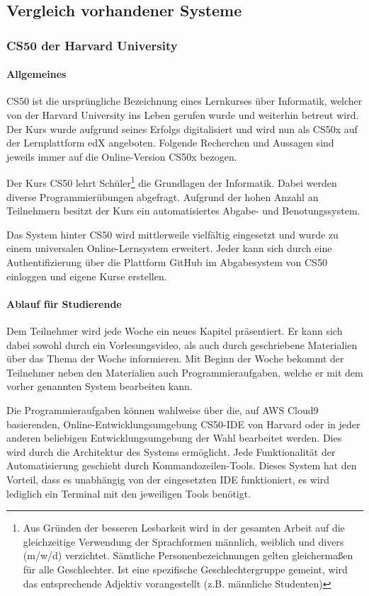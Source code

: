 \subsection{Vergleich vorhandener Systeme}
\subsubsection{CS50 der Harvard University}
\paragraph{Allgemeines}
CS50 ist die ursprüngliche Bezeichnung eines Lernkurses über Informatik,
welcher von der Harvard University ins Leben gerufen wurde und weiterhin
betreut wird. Der Kurs wurde aufgrund seines Erfolgs digitalisiert und wird nun
als CS50x auf der Lernplattform edX angeboten. Folgende Recherchen und Aussagen
sind jeweils immer auf die Online-Version CS50x bezogen.

Der Kurs CS50 lehrt Schüler\footnote{Aus Gründen der besseren Lesbarkeit wird
in der gesamten Arbeit auf die gleichzeitige Verwendung der Sprachformen
männlich, weiblich und divers (m/w/d) verzichtet. Sämtliche
Personenbezeichnungen gelten gleichermaßen für alle Geschlechter. Ist eine
spezifische Geschlechtergruppe gemeint, wird das entsprechende Adjektiv
vorangestellt (z.B. \glqq männliche Studenten\grqq)} die Grundlagen der
Informatik. Dabei werden diverse Programmierübungen abgefragt. Aufgrund der
hohen Anzahl an Teilnehmern besitzt der Kurs ein automatisiertes Abgabe- und Benotungssystem.

Das System hinter CS50 wird mittlerweile vielfältig eingesetzt und wurde zu
einem universalen Online-Lernsystem erweitert. Jeder kann sich durch eine
Authentifizierung über die Plattform GitHub im Abgabesystem von CS50 einloggen
und eigene Kurse erstellen. \cite{cs50}

\newpage
\paragraph{Ablauf für Studierende}
Dem Teilnehmer wird jede Woche ein neues Kapitel präsentiert. Er kann sich dabei
sowohl durch ein Vorlesungsvideo, als auch durch geschriebene Materialien über
das Thema der Woche informieren. Mit Beginn der Woche bekommt der Teilnehmer
neben den Materialien auch Programmieraufgaben, welche er mit dem vorher
genannten System bearbeiten kann. \cite{cs50-edx}

Die Programmieraufgaben können wahlweise über die, auf AWS Cloud9 basierenden,
Online-Entwicklungsumgebung \glqq CS50-IDE\grqq{} von Harvard oder in jeder
anderen beliebigen Entwicklungsumgebung der Wahl bearbeitet werden. Dies
wird durch die Architektur des Systems ermöglicht. Jede Funktionalität der
Automatisierung geschieht durch Kommandozeilen-Tools. Dieses System hat den
Vorteil, dass es unabhängig von der eingesetzten IDE funktioniert, es wird
lediglich ein Terminal mit den jeweiligen Tools benötigt. \cite{cs50-ide}

